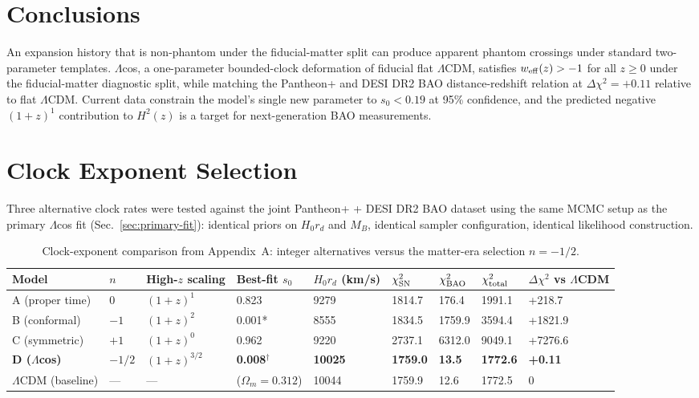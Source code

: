 \documentclass[
  aps,
  prd,
  onecolumn,         %
  nofootinbib,
  longbibliography
]{revtex4-2}
\begin{document}
\section{Conclusions}\label{sec:conclusions}

An expansion history that is non-phantom under the fiducial-matter split can produce apparent phantom crossings
under standard two-parameter templates. $\Lambda$cos, a one-parameter
bounded-clock deformation of fiducial flat $\Lambda$CDM, satisfies
$w_{\rm eff}(z) > -1$ for all $z \geq 0$ under the fiducial-matter
diagnostic split, while matching the Pantheon+ and DESI DR2 BAO
distance-redshift relation at $\Delta\chi^2 = +0.11$ relative to flat
$\Lambda$CDM.
Current data constrain the model's single new parameter to
$s_0 < 0.19$ at 95\% confidence, and the predicted negative $(1+z)^1$
contribution to $H^2(z)$ is a target for next-generation BAO measurements.

\pagebreak

\appendix

\section{Clock Exponent Selection}\label{sec:appendix}

Three alternative clock rates were tested against the joint Pantheon+ +
DESI DR2 BAO dataset using the same MCMC setup as the primary $\Lambda$cos fit
(Sec.~\ref{sec:primary-fit}): identical priors on $H_0 r_d$ and $M_B$, identical sampler
configuration, identical likelihood construction.

\begin{table}[!ht]
\centering\footnotesize
\caption{Clock-exponent comparison from Appendix~A: integer alternatives versus the matter-era selection $n=-1/2$.}\label{tab:appendix-a}
\begin{tabular}{@{}lllllllll@{}}
\toprule
Model & $n$ & High-$z$ scaling & Best-fit $s_0$ & $H_0 r_d$ (km/s) & $\chi^2_{\rm SN}$ & $\chi^2_{\rm BAO}$ & $\chi^2_{\rm total}$ & $\Delta\chi^2$ vs $\Lambda$CDM \\
\midrule

A (proper time) & $0$ & $(1+z)^1$ & 0.823 & 9279 & 1814.7 & 176.4 & 1991.1 &
+218.7 \\
B (conformal) & $-1$ & $(1+z)^2$ & 0.001* & 8555 & 1834.5 & 1759.9 & 3594.4 &
+1821.9 \\
C (symmetric) & $+1$ & $(1+z)^0$ & 0.962 & 9220 & 2737.1 & 6312.0 & 9049.1 &
+7276.6 \\
\textbf{D ($\Lambda$cos)} & \textbf{$-1/2$} & \textbf{$(1+z)^{3/2}$} & \textbf{0.008$^\dagger$}
& \textbf{10025} & \textbf{1759.0} & \textbf{13.5} & \textbf{1772.6} &
\textbf{+0.11} \\
$\Lambda$CDM (baseline) & --- & --- & ($\Omega_m = 0.312$) & 10044 & 1759.9 & 12.6 &
1772.5 & 0 \\
\bottomrule
\end{tabular}
\end{table}
\end{document}
